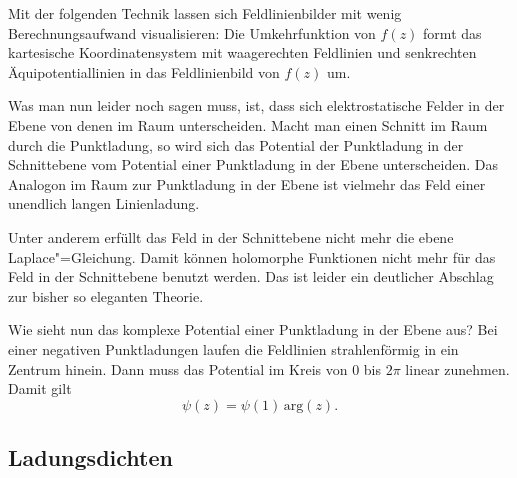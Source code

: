 \documentclass[a4paper,10pt,fleqn,twocolumn,twoside,dvipdfmx]{scrartcl}
\begin{document}
Mit der folgenden Technik lassen sich Feldlinienbilder mit wenig
Berechnungsaufwand visualisieren: Die Umkehrfunktion von $f(z)$
formt das kartesische Koordinatensystem mit waagerechten Feldlinien
und senkrechten Äquipotentiallinien in das Feldlinienbild
von $f(z)$ um.

Was man nun leider noch sagen muss, ist, dass sich elektrostatische
Felder in der Ebene von denen im Raum unterscheiden. Macht man
einen Schnitt im Raum durch die Punktladung, so wird sich das
Potential der Punktladung
in der Schnittebene vom Potential einer Punktladung in der Ebene
unterscheiden. Das Analogon im Raum zur Punktladung in der Ebene ist
vielmehr das Feld einer unendlich langen Linienladung.

Unter anderem erfüllt das Feld in der Schnittebene nicht mehr die
ebene Laplace"=Gleichung. Damit können holomorphe Funktionen nicht mehr
für das Feld in der Schnittebene benutzt werden. Das ist leider ein
deutlicher Abschlag zur bisher so eleganten Theorie.

Wie sieht nun das komplexe Potential einer Punktladung in der Ebene
aus? Bei einer negativen Punktladungen laufen die Feldlinien
strahlenförmig in ein Zentrum hinein. Dann muss das Potential
im Kreis von $0$ bis $2\pi$ linear zunehmen. Damit gilt%
\[\psi(z) = \psi(1)\,\mathrm{arg}(z).\]

\subsection{Ladungsdichten}
\end{document}
